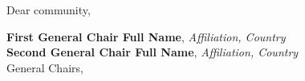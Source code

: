 
Dear community,

\lipsum[3-6]

\vspace{1ex}
\noindent
\textbf{First General Chair Full Name}, \textit{Affiliation, Country}\\
\textbf{Second General Chair Full Name}, \textit{Affiliation, Country}\\
General Chairs, \conferenceAcronym\\
